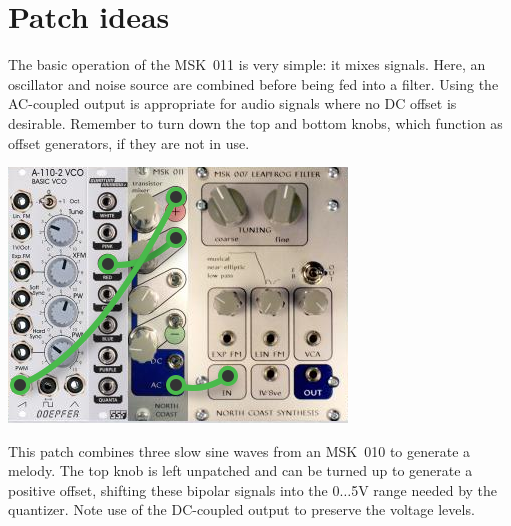 
%
%
%
%
%
%

\chapter{Patch ideas}

The basic operation of the MSK~011 is very simple:  it mixes signals.  Here,
an oscillator and noise source are combined before being fed into a filter. 
Using the AC-coupled output is appropriate for audio signals where no DC
offset is desirable.  Remember to turn down the top and bottom knobs, which
function as offset generators, if they are not in use.

\nopagebreak\noindent
{\hspace*{\fill}\includegraphics[scale=0.6]{patch1.png}\hspace*{\fill}\par} 

This patch combines three slow sine waves from an MSK~010 to generate a
melody.  The top knob is left unpatched and can be turned up to generate a
positive offset, shifting these bipolar signals into the 0$\ldots$5V range
needed by the quantizer.  Note use of the DC-coupled output to preserve the
voltage levels.

